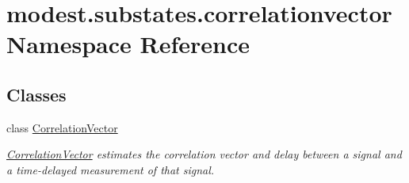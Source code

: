 \hypertarget{namespacemodest_1_1substates_1_1correlationvector}{}\section{modest.\+substates.\+correlationvector Namespace Reference}
\label{namespacemodest_1_1substates_1_1correlationvector}
\subsection*{Classes}
\begin{DoxyCompactItemize}
\item 
class \hyperlink{classmodest_1_1substates_1_1correlationvector_1_1CorrelationVector}{Correlation\+Vector}
\begin{DoxyCompactList}\small\item\em \hyperlink{classmodest_1_1substates_1_1correlationvector_1_1CorrelationVector}{Correlation\+Vector} estimates the correlation vector and delay between a signal and a time-\/delayed measurement of that signal. \end{DoxyCompactList}\end{DoxyCompactItemize}
